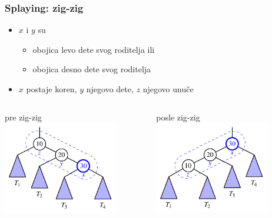 \documentclass[compress]{beamer}
\begin{document}
\begin{frame}[fragile]
  \frametitle{Splaying: zig-zig}
  \begin{itemize}
    \item $x$ i $y$ su  
    \begin{itemize}
      \item obojica levo dete svog roditelja ili
      \item obojica desno dete svog roditelja
    \end{itemize}
    \item $x$ postaje koren, $y$ njegovo dete, $z$ njegovo unuče
  \end{itemize}
  \begin{columns}
    \begin{column}[t]{6cm}
      \begin{center}
        pre zig-zig 
        \includegraphics[width=5cm]{asp-11-pic18a.pdf}
      \end{center}
    \end{column}  
    \begin{column}[t]{6cm}
      \begin{center}
        posle zig-zig
        \includegraphics[width=5cm]{asp-11-pic18b.pdf}
      \end{center}
    \end{column}  
  \end{columns}
\end{frame}
\end{document}
